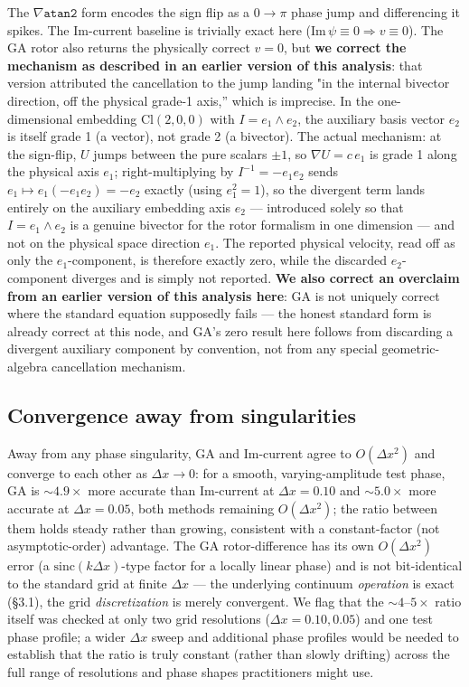 \documentclass[11pt]{article}
\newcommand{\Cl}{\mathrm{Cl}}
\begin{document}
The $\nabla\mathtt{atan2}$ form encodes the sign flip as a $0\to\pi$ phase jump and differencing it spikes. The Im-current baseline is trivially exact here ($\mathrm{Im}\,\psi\equiv0\Rightarrow v\equiv0$). The GA rotor also returns the physically correct $v=0$, but \textbf{we correct the mechanism as described in an earlier version of this analysis}: that version attributed the cancellation to the jump landing "in the internal bivector direction, off the physical grade-1 axis,'' which is imprecise. In the one-dimensional embedding $\Cl(2,0,0)$ with $I=e_1\wedge e_2$, the auxiliary basis vector $e_2$ is itself grade 1 (a vector), not grade 2 (a bivector). The actual mechanism: at the sign-flip, $U$ jumps between the pure scalars $\pm1$, so $\nabla U=c\,e_1$ is grade 1 along the physical axis $e_1$; right-multiplying by $I^{-1}=-e_1e_2$ sends $e_1\mapsto e_1(-e_1e_2)=-e_2$ exactly (using $e_1^2=1$), so the divergent term lands entirely on the auxiliary embedding axis $e_2$ — introduced solely so that $I=e_1\wedge e_2$ is a genuine bivector for the rotor formalism in one dimension — and not on the physical space direction $e_1$. The reported physical velocity, read off as only the $e_1$-component, is therefore exactly zero, while the discarded $e_2$-component diverges and is simply not reported. \textbf{We also correct an overclaim from an earlier version of this analysis here}: GA is not uniquely correct where the standard equation supposedly fails — the honest standard form is already correct at this node, and GA's zero result here follows from discarding a divergent auxiliary component by convention, not from any special geometric-algebra cancellation mechanism.

\subsection{Convergence away from singularities}

Away from any phase singularity, GA and Im-current agree to $O(\Delta x^2)$ and converge to each other as $\Delta x\to0$: for a smooth, varying-amplitude test phase, GA is $\sim4.9\times$ more accurate than Im-current at $\Delta x=0.10$ and $\sim5.0\times$ more accurate at $\Delta x=0.05$, both methods remaining $O(\Delta x^2)$; the ratio between them holds steady rather than growing, consistent with a constant-factor (not asymptotic-order) advantage. The GA rotor-difference has its own $O(\Delta x^2)$ error (a $\mathrm{sinc}(k\Delta x)$-type factor for a locally linear phase) and is not bit-identical to the standard grid at finite $\Delta x$ — the underlying continuum \emph{operation} is exact (\S3.1), the grid \emph{discretization} is merely convergent. We flag that the $\sim\!4$--$5\times$ ratio itself was checked at only two grid resolutions ($\Delta x=0.10,0.05$) and one test phase profile; a wider $\Delta x$ sweep and additional phase profiles would be needed to establish that the ratio is truly constant (rather than slowly drifting) across the full range of resolutions and phase shapes practitioners might use.
\end{document}
